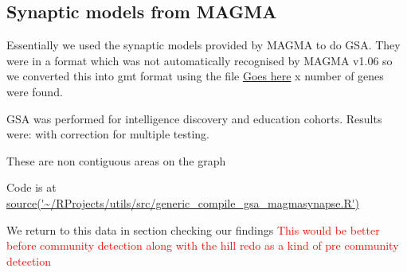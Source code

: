 \subsection{Synaptic models from MAGMA}

Essentially we used the synaptic models provided by MAGMA to do GSA. They were in a format which was not automatically recognised by MAGMA v1.06 so we converted this into gmt format using the file \url{Goes here}
x number of genes were found. 

GSA was performed for intelligence discovery and education cohorts. 
Results were: with correction for multiple testing.

These are non contiguous areas on the graph

Code is at \url{source('~/RProjects/utils/src/generic_compile_gsa_magmasynapse.R')}

We return to this data in section checking our findings 
\textcolor{red}{This would be better before community detection along with the hill redo as a kind of pre community detection}
